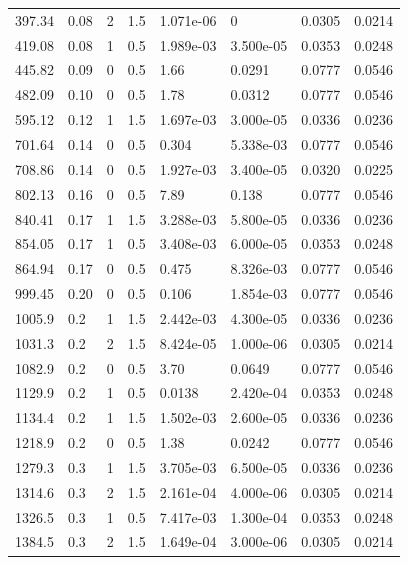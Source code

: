 \documentclass[preview]{standalone}
\begin{document}
{{\begin{tabular}{L{1.2cm}C{1.2cm} C{0.3cm}C{0.5cm} C{1.4cm}C{1.4cm} C{1.4cm}C{1.4cm}}
  397.34  &  0.08  & 2     & 1.5 &  1.071e-06  & 0  & 0.0305 &  0.0214   \\ 
  419.08  &  0.08  & 1     & 0.5 &  1.989e-03  & 3.500e-05  & 0.0353 &  0.0248   \\ 
  445.82  &  0.09  & 0     & 0.5 &  1.66  & 0.0291  & 0.0777 &  0.0546   \\ 
  482.09  &  0.10  & 0     & 0.5 &  1.78  & 0.0312  & 0.0777 &  0.0546   \\ 
  595.12  &  0.12  & 1     & 1.5 &  1.697e-03  & 3.000e-05  & 0.0336 &  0.0236   \\ 
  701.64  &  0.14  & 0     & 0.5 &  0.304  & 5.338e-03  & 0.0777 &  0.0546   \\ 
  708.86  &  0.14  & 0     & 0.5 &  1.927e-03  & 3.400e-05  & 0.0320 &  0.0225   \\ 
  802.13  &  0.16  & 0     & 0.5 &  7.89  & 0.138  & 0.0777 &  0.0546   \\ 
  840.41  &  0.17  & 1     & 1.5 &  3.288e-03  & 5.800e-05  & 0.0336 &  0.0236   \\ 
  854.05  &  0.17  & 1     & 0.5 &  3.408e-03  & 6.000e-05  & 0.0353 &  0.0248   \\ 
  864.94  &  0.17  & 0     & 0.5 &  0.475  & 8.326e-03  & 0.0777 &  0.0546   \\ 
  999.45  &  0.20  & 0     & 0.5 &  0.106  & 1.854e-03  & 0.0777 &  0.0546   \\ 
  1005.9  &   0.2  & 1     & 1.5 &  2.442e-03  & 4.300e-05  & 0.0336 &  0.0236   \\ 
  1031.3  &   0.2  & 2     & 1.5 &  8.424e-05  & 1.000e-06  & 0.0305 &  0.0214   \\ 
  1082.9  &   0.2  & 0     & 0.5 &  3.70  & 0.0649  & 0.0777 &  0.0546   \\ 
  1129.9  &   0.2  & 1     & 0.5 &  0.0138  & 2.420e-04  & 0.0353 &  0.0248   \\ 
  1134.4  &   0.2  & 1     & 1.5 &  1.502e-03  & 2.600e-05  & 0.0336 &  0.0236   \\ 
  1218.9  &   0.2  & 0     & 0.5 &  1.38  & 0.0242  & 0.0777 &  0.0546   \\ 
  1279.3  &   0.3  & 1     & 1.5 &  3.705e-03  & 6.500e-05  & 0.0336 &  0.0236   \\ 
  1314.6  &   0.3  & 2     & 1.5 &  2.161e-04  & 4.000e-06  & 0.0305 &  0.0214   \\ 
  1326.5  &   0.3  & 1     & 0.5 &  7.417e-03  & 1.300e-04  & 0.0353 &  0.0248   \\ 
  1384.5  &   0.3  & 2     & 1.5 &  1.649e-04  & 3.000e-06  & 0.0305 &  0.0214   \\ 

\end{tabular}}}
\end{document}
